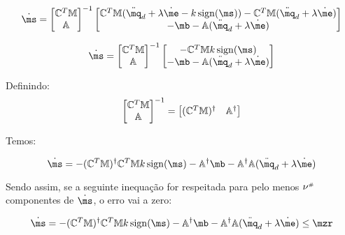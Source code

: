  $$ \dot{\ms} =  \begin{bmatrix}
\mC^T \mM \\
\mA
\end{bmatrix}^{-1}
\begin{bmatrix}
 \mC^T \mM (\ddot{\mq}_d + \lambda \dot{\me} - k  \sign (\ms)) -  \mC^T \mM(\ddot{\mq}_d  + \lambda \dot{\me}) \\
-\mb - \mA(\ddot{\mq}_d  + \lambda \dot{\me})
\end{bmatrix} $$

 $$ \dot{\ms} =  \begin{bmatrix}
\mC^T \mM \\
\mA
\end{bmatrix}^{-1}
\begin{bmatrix}
- \mC^T \mM  k  \sign (\ms) \\
-\mb - \mA(\ddot{\mq}_d  + \lambda \dot{\me})
\end{bmatrix} $$

Definindo:
$$\begin{bmatrix}
\mathbb{C}^T \mathbb{M} \\
\mathbb{A}
\end{bmatrix}^{-1}
=
\begin{bmatrix}
(\mathbb{C}^T \mathbb{M})^\dagger & \mathbb{A}^\dagger
\end{bmatrix} $$

Temos:

$$\dot{\ms} = 
- (\mC^T \mM)^\dagger \mC^T \mM  k  \sign (\ms) - \mA^\dagger\mb - \mA^\dagger \mA(\ddot{\mq}_d  + \lambda \dot{\me}) $$

Sendo assim, se a seguinte inequação for respeitada para pelo menos $\nu^{\scriptscriptstyle \#}$ componentes de $\dot{\ms}$, o erro vai a zero:

$$\dot{\ms} = 
- (\mC^T \mM)^\dagger \mC^T \mM  k  \sign (\ms) - \mA^\dagger\mb - \mA^\dagger \mA(\ddot{\mq}_d  + \lambda \dot{\me}) \leq \mzr $$